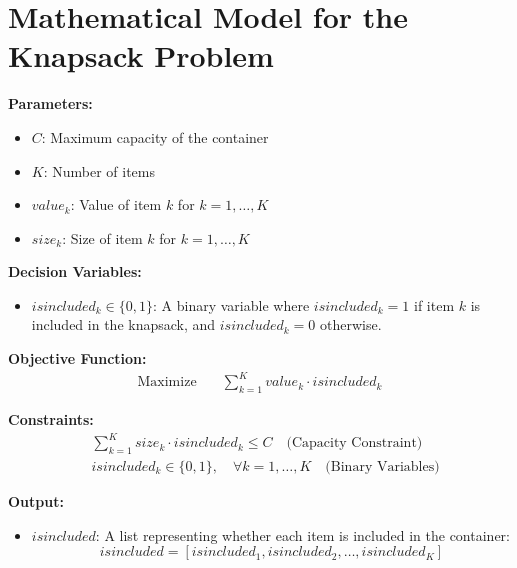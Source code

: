\documentclass{article}
\begin{document}
\section*{Mathematical Model for the Knapsack Problem}

\textbf{Parameters:}
\begin{itemize}
    \item $C$: Maximum capacity of the container
    \item $K$: Number of items
    \item $value_k$: Value of item $k$ for $k = 1, \ldots, K$
    \item $size_k$: Size of item $k$ for $k = 1, \ldots, K$
\end{itemize}

\textbf{Decision Variables:}
\begin{itemize}
    \item $isincluded_k \in \{0, 1\}$: A binary variable where $isincluded_k = 1$ if item $k$ is included in the knapsack, and $isincluded_k = 0$ otherwise.
\end{itemize}

\textbf{Objective Function:}
\begin{align*}
    \text{Maximize} \quad & \sum_{k=1}^{K} value_k \cdot isincluded_k
\end{align*}

\textbf{Constraints:}
\begin{align*}
    & \sum_{k=1}^{K} size_k \cdot isincluded_k \leq C \quad \text{(Capacity Constraint)} \\
    & isincluded_k \in \{0, 1\}, \quad \forall k = 1, \ldots, K \quad \text{(Binary Variables)}
\end{align*}

\textbf{Output:}
\begin{itemize}
    \item $isincluded$: A list representing whether each item is included in the container:
    \[
    isincluded = [isincluded_1, isincluded_2, \ldots, isincluded_K]
    \]
\end{itemize}
\end{document}
